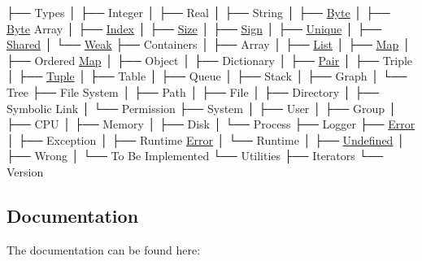 \begin{DoxyCode}
├── Types
│   ├── Integer
│   ├── Real
│   ├── String
│   ├── \hyperlink{namespacelibrary_1_1core_1_1types_ae37635b89098069fb3b8c5181edd0945}{Byte}
│   ├── \hyperlink{namespacelibrary_1_1core_1_1types_ae37635b89098069fb3b8c5181edd0945}{Byte} Array
│   ├── \hyperlink{namespacelibrary_1_1core_1_1types_ad87eeb821d7067ec94e06ed1980d6350}{Index}
│   ├── \hyperlink{namespacelibrary_1_1core_1_1types_a701626ea1027888ebbb8cfd0ff7adab0}{Size}
│   ├── \hyperlink{namespacelibrary_1_1core_1_1types_a06d9eaa410d43a0fa3f383040618e87d}{Sign}
│   ├── \hyperlink{namespacelibrary_1_1core_1_1types_ac12d38691838fbc9a36765ee62ace52a}{Unique}
│   ├── \hyperlink{namespacelibrary_1_1core_1_1types_a3dae1a00f899bac0366794fa85eda8ee}{Shared}
│   └── \hyperlink{namespacelibrary_1_1core_1_1types_a26c13c272f9fba4ce17ee4980be6703c}{Weak}
├── Containers
│   ├── Array
│   ├── \hyperlink{namespacelibrary_1_1core_1_1ctnr_a87ccf40619002299b341a5e76e989912}{List}
│   ├── \hyperlink{namespacelibrary_1_1core_1_1ctnr_a248e088a0b4ec44aff451a5c3663dcee}{Map}
│   ├── Ordered \hyperlink{namespacelibrary_1_1core_1_1ctnr_a248e088a0b4ec44aff451a5c3663dcee}{Map}
│   ├── Object
│   ├── Dictionary
│   ├── \hyperlink{namespacelibrary_1_1core_1_1ctnr_aad6f8de4c0f279c10436d59d4ace74bd}{Pair}
│   ├── Triple
│   ├── \hyperlink{namespacelibrary_1_1core_1_1ctnr_a551ef72e2adb570c4d6bdf5e1bbc96b9}{Tuple}
│   ├── Table
│   ├── Queue
│   ├── Stack
│   ├── Graph
│   └── Tree
├── File System
│   ├── Path
│   ├── File
│   ├── Directory
│   ├── Symbolic Link
│   └── Permission
├── System
│   ├── User
│   ├── Group
│   ├── CPU
│   ├── Memory
│   ├── Disk
│   └── Process
├── Logger
├── \hyperlink{namespacelibrary_1_1core_1_1logger_a35f71353edf64f68f7fe3874b01abaa8a902b0d55fddef6f8d651fe1035b7d4bd}{Error}
│   ├── Exception
│   ├── Runtime \hyperlink{namespacelibrary_1_1core_1_1logger_a35f71353edf64f68f7fe3874b01abaa8a902b0d55fddef6f8d651fe1035b7d4bd}{Error}
│   └── Runtime
│       ├── \hyperlink{namespacelibrary_1_1core_1_1types_a06d9eaa410d43a0fa3f383040618e87daec0fc0100c4fc1ce4eea230c3dc10360}{Undefined}
│       ├── Wrong
│       └── To Be Implemented
└── Utilities
    ├── Iterators
    └── Version
\end{DoxyCode}


\subsection*{Documentation}

The documentation can be found here\+:



